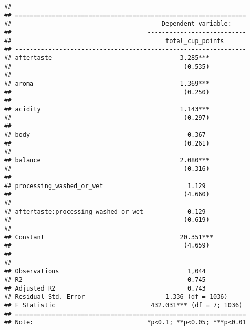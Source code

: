 \documentclass[
]{article}
\begin{document}
\begin{verbatim}
## 
## ===============================================================
##                                         Dependent variable:    
##                                     ---------------------------
##                                          total_cup_points      
## ---------------------------------------------------------------
## aftertaste                                   3.285***          
##                                               (0.535)          
##                                                                
## aroma                                        1.369***          
##                                               (0.250)          
##                                                                
## acidity                                      1.143***          
##                                               (0.297)          
##                                                                
## body                                           0.367           
##                                               (0.261)          
##                                                                
## balance                                      2.080***          
##                                               (0.316)          
##                                                                
## processing_washed_or_wet                       1.129           
##                                               (4.660)          
##                                                                
## aftertaste:processing_washed_or_wet           -0.129           
##                                               (0.619)          
##                                                                
## Constant                                     20.351***         
##                                               (4.659)          
##                                                                
## ---------------------------------------------------------------
## Observations                                   1,044           
## R2                                             0.745           
## Adjusted R2                                    0.743           
## Residual Std. Error                      1.336 (df = 1036)     
## F Statistic                          432.031*** (df = 7; 1036) 
## ===============================================================
## Note:                               *p<0.1; **p<0.05; ***p<0.01
\end{verbatim}
\end{document}
